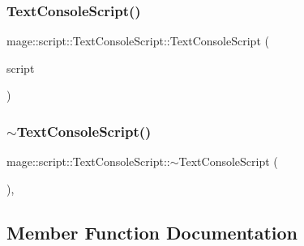 \hypertarget{classmage_1_1script_1_1_text_console_script_ac54103d71cc752e149ecaa98021d2692}{}\label{classmage_1_1script_1_1_text_console_script_ac54103d71cc752e149ecaa98021d2692} 
\subsubsection{\texorpdfstring{Text\+Console\+Script()}{TextConsoleScript()}\hspace{0.1cm}{\footnotesize\ttfamily [3/3]}}
{\footnotesize\ttfamily mage\+::script\+::\+Text\+Console\+Script\+::\+Text\+Console\+Script (\begin{DoxyParamCaption}\item[{\hyperlink{classmage_1_1script_1_1_text_console_script}{Text\+Console\+Script} \&\&}]{script }\end{DoxyParamCaption})\hspace{0.3cm}{\ttfamily [default]}}

\hypertarget{classmage_1_1script_1_1_text_console_script_af0959c8a4f21bb4f9b5553dffc5710b9}{}\label{classmage_1_1script_1_1_text_console_script_af0959c8a4f21bb4f9b5553dffc5710b9} 
\subsubsection{\texorpdfstring{$\sim$\+Text\+Console\+Script()}{~TextConsoleScript()}}
{\footnotesize\ttfamily mage\+::script\+::\+Text\+Console\+Script\+::$\sim$\+Text\+Console\+Script (\begin{DoxyParamCaption}{ }\end{DoxyParamCaption})\hspace{0.3cm}{\ttfamily [virtual]}, {\ttfamily [default]}}



\subsection{Member Function Documentation}
\hypertarget{classmage_1_1script_1_1_text_console_script_a274764deea9f02ec77515680456548d6}{}\label{classmage_1_1script_1_1_text_console_script_a274764deea9f02ec77515680456548d6} 

